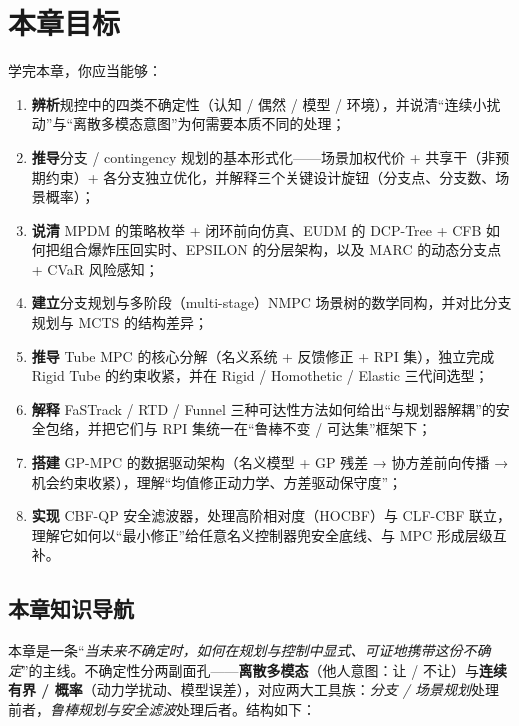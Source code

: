 \section*{本章目标}
学完本章，你应当能够：
\begin{enumerate}
  \item \textbf{辨析}规控中的四类不确定性（认知 / 偶然 / 模型 / 环境），并说清“连续小扰动”与“离散多模态意图”为何需要本质不同的处理；
  \item \textbf{推导}分支 / contingency 规划的基本形式化——场景加权代价 + 共享干（非预期约束）+ 各分支独立优化，并解释三个关键设计旋钮（分支点、分支数、场景概率）；
  \item \textbf{说清} MPDM 的策略枚举 + 闭环前向仿真、EUDM 的 DCP-Tree + CFB 如何把组合爆炸压回实时、EPSILON 的分层架构，以及 MARC 的动态分支点 + CVaR 风险感知；
  \item \textbf{建立}分支规划与多阶段（multi-stage）NMPC 场景树的数学同构，并对比分支规划与 MCTS 的结构差异；
  \item \textbf{推导} Tube MPC 的核心分解（名义系统 + 反馈修正 + RPI 集），独立完成 Rigid Tube 的约束收紧，并在 Rigid / Homothetic / Elastic 三代间选型；
  \item \textbf{解释} FaSTrack / RTD / Funnel 三种可达性方法如何给出“与规划器解耦”的安全包络，并把它们与 RPI 集统一在“鲁棒不变 / 可达集”框架下；
  \item \textbf{搭建} GP-MPC 的数据驱动架构（名义模型 + GP 残差 → 协方差前向传播 → 机会约束收紧），理解“均值修正动力学、方差驱动保守度”；
  \item \textbf{实现} CBF-QP 安全滤波器，处理高阶相对度（HOCBF）与 CLF-CBF 联立，理解它如何以“最小修正”给任意名义控制器兜安全底线、与 MPC 形成层级互补。
\end{enumerate}

\subsection*{本章知识导航}
本章是一条“\emph{当未来不确定时，如何在规划与控制中显式、可证地携带这份不确定}”的主线。不确定性分两副面孔——\textbf{离散多模态}（他人意图：让 / 不让）与\textbf{连续有界 / 概率}（动力学扰动、模型误差），对应两大工具族：\emph{分支 / 场景规划}处理前者，\emph{鲁棒规划与安全滤波}处理后者。结构如下：

